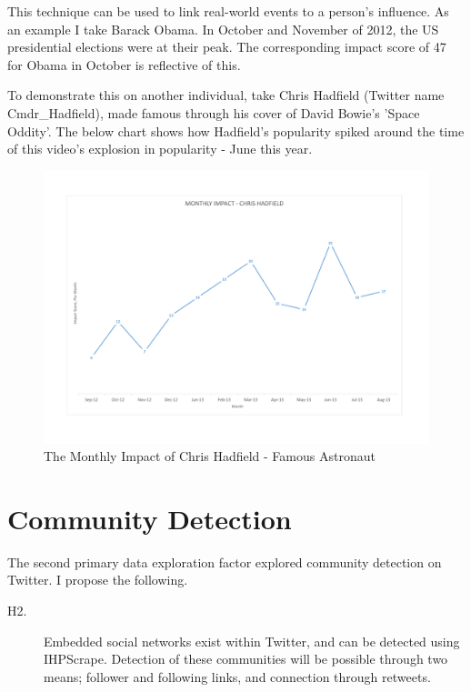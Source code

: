 This technique can be used to link real-world events to a person's influence. As an example I take Barack Obama. In October and November of 2012, the US presidential elections were at their peak. The corresponding impact score of 47 for Obama in October is reflective of this. 

To demonstrate this on another individual, take Chris Hadfield (Twitter name Cmdr\_Hadfield), made famous through his cover of David Bowie's 'Space Oddity'. The below chart shows how Hadfield's popularity spiked around the time of this video's explosion in popularity - June this year. 

\begin{figure}[h!]
\centering
\includegraphics[width=500px]{Images/chris_hadfield_monthly_impact.pdf}
\caption{The Monthly Impact of Chris Hadfield - Famous Astronaut}
\end{figure}

\section{Community Detection}

The second primary data exploration factor explored community detection on Twitter. I propose the following. 

\begin{description}
\item[H2.]{Embedded social networks exist within Twitter, and can be detected using IHPScrape. Detection of these communities will be possible through two means; follower and following links, and connection through retweets.}
\end{description}

